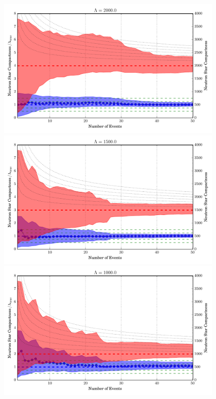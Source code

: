 \documentclass[aps,prd,amsmath,floats,floatfix, twocolumn,
superscriptaddress,nofootinbib,showpacs]{revtex4-1}
\begin{document}
\begin{figure}
\centering    
\includegraphics[width=1.\columnwidth]{plots/FillBetweenNormErrorBarsLambda_vs_N_L2000.pdf}
\includegraphics[width=1.\columnwidth]{plots/FillBetweenNormErrorBarsLambda_vs_N_L1500.pdf}\\
\includegraphics[width=1.\columnwidth]{plots/FillBetweenNormErrorBarsLambda_vs_N_L1000.pdf}

\end{figure}
\end{document}
